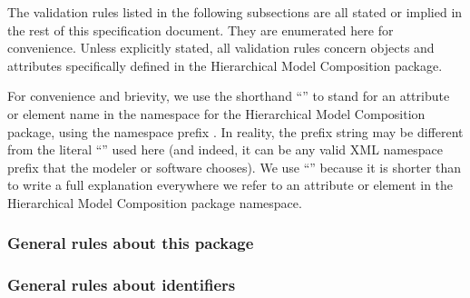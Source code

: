 The validation rules listed in the following subsections are all stated or implied in the rest of this specification document. They are enumerated here for convenience. Unless explicitly stated, all validation rules concern objects and attributes specifically defined in the Hierarchical Model Composition package.

For \notice convenience and brievity, we use the shorthand ``'' to stand for an attribute or element name  in the namespace for the Hierarchical Model Composition package, using the namespace prefix . In reality, the prefix string may be different from the literal ``'' used here (and indeed, it can be any valid XML namespace prefix that the modeler or software chooses). We use ``'' because it is shorter than to write a full explanation everywhere we refer to an attribute or element in the Hierarchical Model Composition package namespace.


\subsubsection*{General rules about this package}

 


\subsubsection*{General rules about identifiers} 

